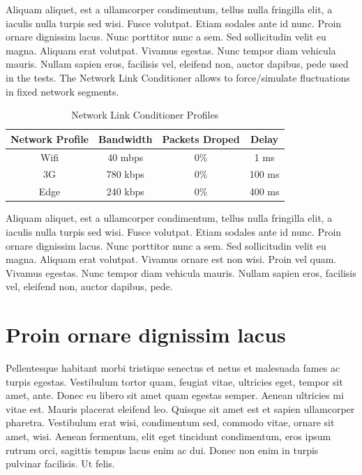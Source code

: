 Aliquam aliquet, est a ullamcorper condimentum, tellus nulla fringilla elit, a iaculis nulla turpis sed wisi. Fusce volutpat. Etiam sodales ante id nunc. Proin ornare dignissim lacus. Nunc porttitor nunc a sem. Sed sollicitudin velit eu magna. Aliquam erat volutpat. Vivamus egestas. Nunc tempor diam vehicula mauris. Nullam sapien eros, facilisis vel, eleifend non, auctor dapibus, pede  used in the tests. The Network Link Conditioner allows to force/simulate fluctuations in fixed network segments.

\begin{table}[htb]
\centering
\normalsize
    \caption{Network Link Conditioner Profiles}
    \label{tab:network_profiles}
{\footnotesize
    \begin{tabular}{ | c | c | c | c | }
    \hline 
    \textbf{Network Profile}	& \textbf{Bandwidth} & \textbf{Packets Droped} & \textbf{Delay}\\ \hline \hline
    Wifi  & 40 mbps  &  0\%  &   1 ms \\ \hline
    3G  & 780 kbps  &  0\%  &   100 ms \\ \hline 
    Edge  & 240 kbps  &  0\%  &   400 ms \\ \hline
    \end{tabular}
    }
\end{table}

Aliquam aliquet, est a ullamcorper condimentum, tellus nulla fringilla elit, a iaculis nulla turpis sed wisi. Fusce volutpat. Etiam sodales ante id nunc. Proin ornare dignissim lacus. Nunc porttitor nunc a sem. Sed sollicitudin velit eu magna. Aliquam erat volutpat. Vivamus ornare est non wisi. Proin vel quam. Vivamus egestas. Nunc tempor diam vehicula mauris. Nullam sapien eros, facilisis vel, eleifend non, auctor dapibus, pede.
\section{Proin ornare dignissim lacus}
Pellentesque habitant morbi tristique senectus et netus et malesuada fames ac turpis egestas. Vestibulum tortor quam, feugiat vitae, ultricies eget, tempor sit amet, ante. Donec eu libero sit amet quam egestas semper. Aenean ultricies mi vitae est. Mauris placerat eleifend leo. Quisque sit amet est et sapien ullamcorper pharetra. Vestibulum erat wisi, condimentum sed, commodo vitae, ornare sit amet, wisi. Aenean fermentum, elit eget tincidunt condimentum, eros ipsum rutrum orci, sagittis tempus lacus enim ac dui. Donec non enim in turpis pulvinar facilisis. Ut felis.

